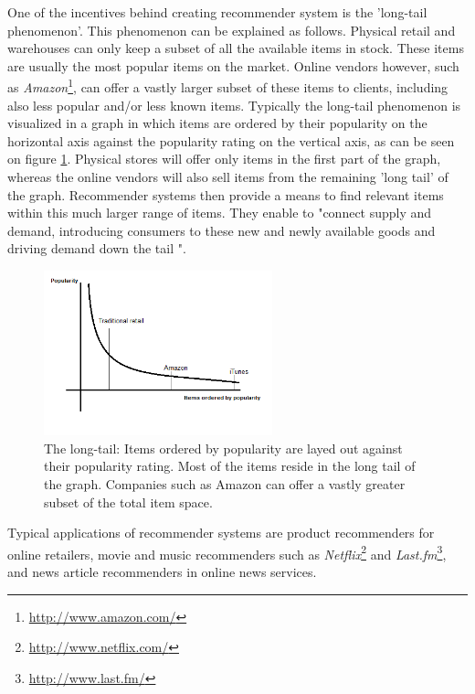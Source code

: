 One of the incentives behind creating recommender system is the 'long-tail phenomenon'\cite{rajaraman:2012}. This phenomenon can be explained as follows. Physical retail and warehouses can only keep a subset of all the available items in stock. These items are usually the most popular items on the market. Online vendors however, such as \emph{Amazon}\footnote{\url{http://www.amazon.com/}}, can offer a vastly larger subset of these items to clients, including also less popular and/or less known items\cite{rajaraman:2012}. Typically the long-tail phenomenon is visualized in a graph in which items are ordered by their popularity on the horizontal axis against the popularity rating on the vertical axis, as can be seen on figure \ref{figure:longtail}. Physical stores will offer only items in the first part of the graph, whereas the online vendors will also sell items from the remaining 'long tail' of the graph\cite{rajaraman:2012, celma:2008:phd}. Recommender systems then provide a means to find relevant items within this much larger range of items\cite{rajaraman:2012}. They enable to "connect supply and demand, introducing consumers to these new and newly available goods and driving demand down the tail "\cite{anderson:2006:LTW:1197299, celma:2008:phd}.

\begin{figure}%
	\begin{center}
		\includegraphics[width=250px]{img/longtail}%
	\end{center}
	\caption{The long-tail: Items ordered by popularity are layed out against their popularity rating. Most of the items reside in the long tail of the graph. Companies such as Amazon can offer a vastly greater subset of the total item space.}%
	\label{figure:longtail}%
\end{figure}

Typical applications of recommender systems are product recommenders for online retailers, movie and music recommenders such as \emph{Netflix}\footnote{\url{http://www.netflix.com/}} and \emph{Last.fm}\footnote{\url{http://www.last.fm/}}, and news article recommenders in online news services\cite{levy:2010, rajaraman:2012, celma:2008:phd}.


